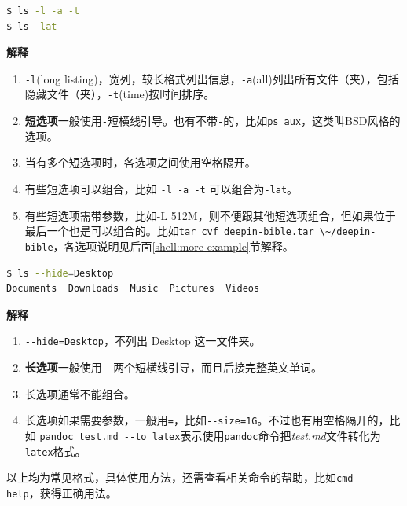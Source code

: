 \documentclass[doctor,openright,twoside]{sjtuthesis}
\providecommand{\tightlist}{%
    \setlength{\itemsep}{0pt}\setlength{\parskip}{0pt}}
\newcommand{\passthrough}[1]{#1}
\theoremstyle{plain}
\theoremstyle{definition}
\theoremstyle{remark}
\theoremstyle{ocrenumbox}
\theoremstyle{plain}
\begin{document}
\begin{lstlisting}[language=bash]
$ ls -l -a -t
$ ls -lat
\end{lstlisting}

\textbf{解释}

\begin{enumerate}
\def\labelenumi{\arabic{enumi}.}
\tightlist
\item
  \passthrough{\lstinline!-l!}(long listing)，宽列，较长格式列出信息，\passthrough{\lstinline!-a!}(all)列出所有文件（夹），包括隐藏文件（夹），\passthrough{\lstinline!-t!}(time)按时间排序。
\item
  \textbf{短选项}一般使用\passthrough{\lstinline!-!}短横线引导。也有不带\passthrough{\lstinline!-!}的，比如\passthrough{\lstinline!ps aux!}，这类叫BSD风格的选项。
\item
  当有多个短选项时，各选项之间使用空格隔开。
\item
  有些短选项可以组合，比如 \passthrough{\lstinline!-l -a -t!} 可以组合为\passthrough{\lstinline!-lat!}。
\item
  有些短选项需带参数，比如-L 512M，则不便跟其他短选项组合，但如果位于最后一个也是可以组合的。比如\passthrough{\lstinline!tar cvf deepin-bible.tar \~/deepin-bible!}，各选项说明见后面\ref{shell:more-example}节解释。
\end{enumerate}

\begin{lstlisting}[language=bash]
$ ls --hide=Desktop
Documents  Downloads  Music  Pictures  Videos
\end{lstlisting}

\textbf{解释}

\begin{enumerate}
\def\labelenumi{\arabic{enumi}.}
\tightlist
\item
  \passthrough{\lstinline!--hide=Desktop!}，不列出 Desktop 这一文件夹。
\item
  \textbf{长选项}一般使用\passthrough{\lstinline!--!}两个短横线引导，而且后接完整英文单词。
\item
  长选项通常不能组合。
\item
  长选项如果需要参数，一般用\passthrough{\lstinline!=!}，比如\passthrough{\lstinline!--size=1G!}。不过也有用空格隔开的，比如 \passthrough{\lstinline!pandoc test.md --to latex!}表示使用\passthrough{\lstinline!pandoc!}命令把\emph{test.md}文件转化为\passthrough{\lstinline!latex!}格式。
\end{enumerate}

以上均为常见格式，具体使用方法，还需查看相关命令的帮助，比如\passthrough{\lstinline!cmd --help!}，获得正确用法。
\end{document}
